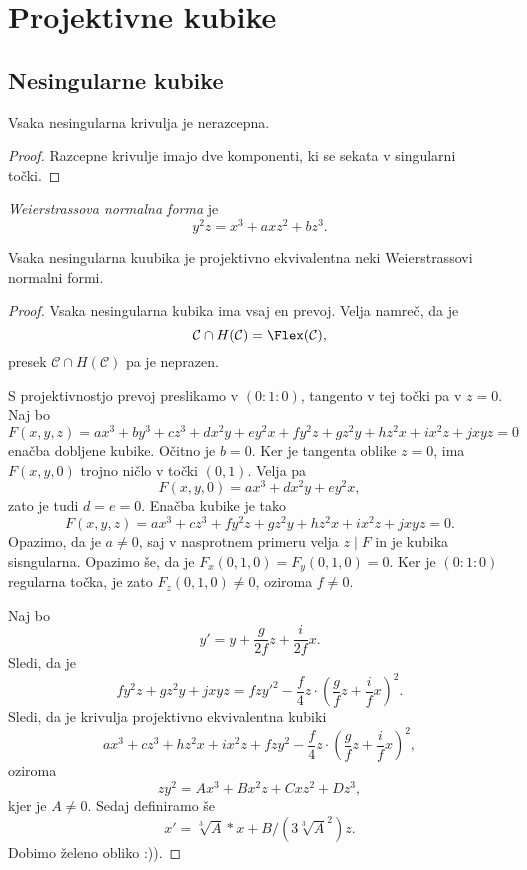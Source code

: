 \section{Projektivne kubike}

\subsection{Nesingularne kubike}


\begin{trditev}
Vsaka nesingularna krivulja je nerazcepna.
\end{trditev}

\begin{proof}
Razcepne krivulje imajo dve komponenti, ki se sekata v singularni
točki.
\end{proof}

\begin{definicija}
\emph{Weierstrassova normalna forma}
je
\[
y^2z = x^3 + axz^2 + bz^3.
\]
\end{definicija}

\begin{izrek}
Vsaka nesingularna kuubika je projektivno ekvivalentna neki
Weierstrassovi normalni formi.
\end{izrek}

\begin{proof}
Vsaka nesingularna kubika ima vsaj en prevoj. Velja namreč, da je
\[
\mathcal{C} \cap H(\mathcal{C}) = \Flex(\mathcal{C}),
\]
presek $\mathcal{C} \cap H(\mathcal{C})$ pa je neprazen.

S projektivnostjo prevoj preslikamo v $(0 : 1 : 0)$, tangento v tej
točki pa v $z = 0$. Naj bo
\[
F(x,y,z) =
ax^3 + by^3 + cz^3 +
dx^2y + ey^2x + fy^2z +
gz^2y + hz^2x + ix^2z +
jxyz =
0
\]
enačba dobljene kubike. Očitno je $b = 0$. Ker je tangenta oblike
$z=0$, ima $F(x,y,0)$ trojno ničlo v točki $(0, 1)$. Velja pa
\[
F(x,y,0) = ax^3 + dx^2y + ey^2x,
\]
zato je tudi $d = e = 0$. Enačba kubike je tako
\[
F(x,y,z) =
ax^3 + cz^3 + fy^2z +
gz^2y + hz^2x + ix^2z +
jxyz =
0.
\]
Opazimo, da je $a \ne 0$, saj v nasprotnem primeru velja $z \mid F$
in je kubika sisngularna. Opazimo še, da je
$F_x(0,1,0) = F_y(0,1,0) = 0$. Ker je $(0 : 1 : 0)$ regularna
točka, je zato $F_z(0,1,0) \ne 0$, oziroma $f \ne 0$.

Naj bo
\[
y' = y + \frac{g}{2f} z + \frac{i}{2f} x.
\]
Sledi, da je
\[
fy^2z + gz^2y + jxyz =
fzy'^2 - \frac{f}{4} z \cdot
\left(\frac{g}{f} z + \frac{i}{f} x\right)^2.
\]
Sledi, da je krivulja projektivno ekvivalentna kubiki
\[
ax^3 + cz^3 + hz^2x + ix^2z + fzy^2 -
\frac{f}{4} z \cdot \left(\frac{g}{f} z + \frac{i}{f} x\right)^2,
\]
oziroma
\[
zy^2 = Ax^3 + Bx^2z + Cxz^2 + Dz^3,
\]
kjer je $A \ne 0$. Sedaj definiramo še
\[
x' = \sqrt[3]{A} * x + B/(3 \sqrt[3]{A}^2) z.
\]
Dobimo želeno obliko :)).
\end{proof}

